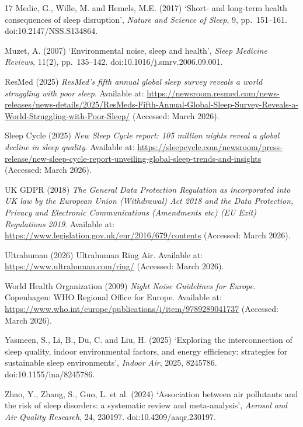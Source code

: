 \documentclass[10pt,a4paper]{extarticle}
\begin{document}
\begin{thebibliography}{17}
Medic, G., Wille, M. and Hemels, M.E. (2017) `Short- and long-term health consequences of sleep disruption', \textit{Nature and Science of Sleep}, 9, pp.~151--161. doi:10.2147/NSS.S134864.

Muzet, A. (2007) `Environmental noise, sleep and health', \textit{Sleep Medicine Reviews}, 11(2), pp.~135--142. doi:10.1016/j.smrv.2006.09.001.

ResMed (2025) \textit{ResMed's fifth annual global sleep survey reveals a world struggling with poor sleep}. Available at: \url{https://newsroom.resmed.com/news-releases/news-details/2025/ResMeds-Fifth-Annual-Global-Sleep-Survey-Reveals-a-World-Struggling-with-Poor-Sleep/} (Accessed: March 2026).

Sleep Cycle (2025) \textit{New Sleep Cycle report: 105 million nights reveal a global decline in sleep quality}. Available at: \url{https://sleepcycle.com/newsroom/press-release/new-sleep-cycle-report-unveiling-global-sleep-trends-and-insights} (Accessed: March 2026).

UK GDPR (2018) \textit{The General Data Protection Regulation as incorporated into UK law by the European Union (Withdrawal) Act 2018 and the Data Protection, Privacy and Electronic Communications (Amendments etc) (EU Exit) Regulations 2019}. Available at: \url{https://www.legislation.gov.uk/eur/2016/679/contents} (Accessed: March 2026).

Ultrahuman (2026) Ultrahuman Ring Air. Available at: \url{https://www.ultrahuman.com/ring/} (Accessed: March 2026).

World Health Organization (2009) \textit{Night Noise Guidelines for Europe}. Copenhagen: WHO Regional Office for Europe. Available at: \url{https://www.who.int/europe/publications/i/item/9789289041737} (Accessed: March 2026).

Yasmeen, S., Li, B., Du, C. and Liu, H. (2025) `Exploring the interconnection of sleep quality, indoor environmental factors, and energy efficiency: strategies for sustainable sleep environments', \textit{Indoor Air}, 2025, 8245786. doi:10.1155/ina/8245786.

Zhao, Y., Zhang, S., Guo, L. et al. (2024) `Association between air pollutants and the risk of sleep disorders: a systematic review and meta-analysis', \textit{Aerosol and Air Quality Research}, 24, 230197. doi:10.4209/aaqr.230197.

\end{thebibliography}
\end{document}
